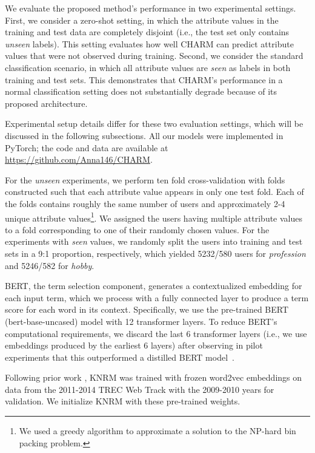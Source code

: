 
We evaluate the proposed method's performance in two experimental settings.
First, we consider a zero-shot setting, in which the attribute values in the training and test data are completely disjoint (i.e., the test set only contains \emph{unseen} labels).
This setting evaluates how well CHARM can predict attribute values that were not observed during training.
Second, we consider the standard classification scenario, in which all attribute values are \emph{seen} as labels in both training and test sets.
This demonstrates that CHARM's performance in a normal classification setting does not substantially degrade because of its proposed architecture.

Experimental setup details
differ for these two evaluation settings, which will be discussed in the following subsections.
All our models were implemented in \gls{PyTorch}; the code and data are available at \href{https://github.com/Anna146/CHARM}{https://github.com/Anna146/CHARM}.


For the \emph{unseen} experiments, we perform ten fold cross-validation with folds constructed such that each attribute value appears in only one test fold.
Each of the folds contains roughly the same number of users and approximately 2-4 unique attribute values\footnote{We used a greedy algorithm to approximate a solution to the NP-hard bin packing problem.}. We assigned the users having multiple attribute values to a fold corresponding to one of their randomly chosen values.
For the experiments with \emph{seen} values, we randomly split the users into training and test sets in a 9:1 proportion, respectively, which yielded 5232/580 users for \emph{profession} and 5246/582 for \emph{hobby}.


BERT, the term selection component, generates a contextualized embedding 
for each input term, which we process with a fully connected layer to produce a term score for each word in its context. Specifically, we use the pre-trained \gls{BERT} (bert-base-uncased) model with 12 transformer layers. 
To reduce BERT's computational requirements, we discard the last 6 transformer layers (i.e., we use embeddings produced by the earliest 6 layers) after observing in pilot experiments that this outperformed a distilled BERT model~\cite{sanh2019distilbert}.

Following prior work \cite{copacrr}, KNRM was trained
with frozen word2vec embeddings on data from the 2011-2014 \gls{TREC Web Track} with the 2009-2010 years for validation. We initialize KNRM with these pre-trained weights.


